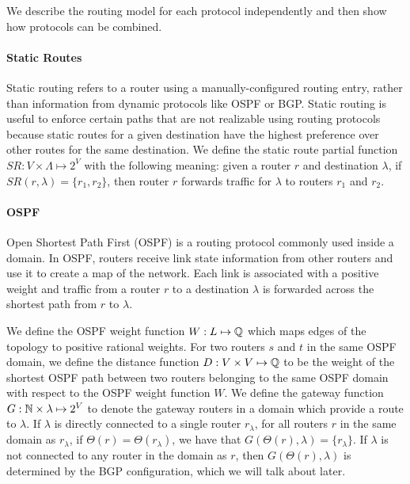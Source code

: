 We describe
the routing model for each protocol independently
and then show how protocols can be combined. 



\paragraph{Static Routes} Static routing refers to a router using a
manually-configured routing entry, rather than information from
dynamic protocols like OSPF or BGP.  Static routing is useful to enforce certain
paths that are not realizable using routing protocols because 
static
routes for a given destination have the highest preference over other routes for the same destination.  
We define the static route partial
function $SR: V \times \Lambda \mapsto 2^V$ with the following meaning:  
given a router $r$
and destination $\lambda$, if $SR(r,\lambda)=\{r_1, r_2\}$, then router
$r$ forwards traffic for $\lambda$ to routers 
$r_1$ and $r_2$.    

\paragraph{OSPF} Open Shortest Path First (OSPF) is a routing
protocol commonly used inside a domain. In OSPF, routers receive link
state information from other routers and use it to create a map of
the network. Each link is associated with a positive weight and traffic from a router $r$ to
a destination $\lambda$ is forwarded across 
the shortest path from $r$ to $\lambda$.

We define the OSPF weight function $W: L \mapsto \mathbb{Q}$ which 
maps edges of the topology to positive rational weights.  
For two routers $s$ and $t$ in the same OSPF domain, 
we define the distance function $D:V \times V \mapsto \mathbb{Q}$ 
to be the weight of the shortest OSPF path between two routers
belonging to the same OSPF domain with respect to the  
OSPF weight function $W$.
We define the gateway function 
$G: \mathbb{N} \times \lambda \mapsto 2^V$ to denote the gateway routers 
in a domain which provide a route to $\lambda$. If $\lambda$ 
is directly connected to a single router $r_\lambda$, for all routers $r$ in the 
same domain as $r_\lambda$,
if 
$\Theta(r) = \Theta(r_\lambda)$, we have that $G(\Theta(r), \lambda) = \{r_\lambda\}$.
If $\lambda$ is not connected
to any router in the domain as $r$, then $G(\Theta(r),\lambda)$ is 
determined by the BGP configuration, which we will talk about later. 




